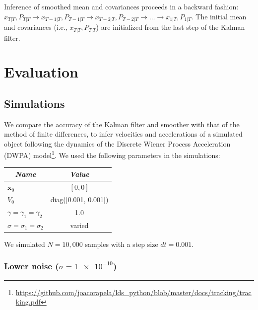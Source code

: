 \documentclass[12pt]{article}
\begin{document}
Inference of smoothed mean and covariances proceeds in a backward fashion:
$x_{T|T}, P_{T|T}\rightarrow x_{T-1|T}, P_{T-1|T}\rightarrow x_{T-2|T},
P_{T-2|T}\rightarrow\ldots\rightarrow  x_{1|T}, P_{1|T}$. The initial mean and
covariances (i.e., $x_{T|T}, P_{T|T}$) are initialized from the last step of
the Kalman filter.

\section{Evaluation}

\subsection{Simulations}

We compare the accuracy of the Kalman filter and smoother with that of the
method of finite differences, to infer velocities and accelerations of a
simulated object following the dynamics of the Discrete Wiener Process
Acceleration (DWPA)
model\footnote{\url{https://github.com/joacorapela/lds_python/blob/master/docs/tracking/tracking.pdf}}.  We used the following parameters in the
simulations:

\begin{center}
    \begin{tabular}{|l|c|}\hline
        \multicolumn{1}{|c|}{\emph{Name}} & \multicolumn{1}{|c|}{\emph{Value}} \\\hline\hline
        $\mathbf{x}_0$                        & $[0, 0]$\\\hline
        $V_0$                                 & diag([0.001, 0.001])\\\hline
        $\gamma=\gamma_1=\gamma_2$            & 1.0\\\hline
        $\sigma=\sigma_1=\sigma_2$            & varied\\\hline
    \end{tabular}
\end{center}

\noindent We simulated $N=10,000$ samples with a step size $dt=0.001$.

\subsubsection{Lower noise ($\sigma=\num{1e-10}$)}
\end{document}
